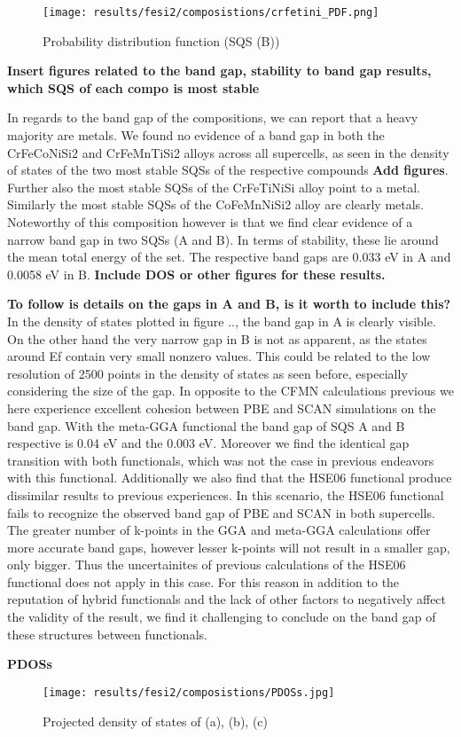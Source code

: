 \begin{figure}[H]
	\centering
	\texttt{[image: results/fesi2/composistions/crfetini\_PDF.png]}
	\caption{Probability distribution function  (SQS (B))}
\end{figure}
    
  
\textbf{Insert figures related to the band gap, stability to band gap results, which SQS of each compo is most stable}  

In regards to the band gap of the compositions, we can report that a heavy majority are metals. We found no evidence of a band gap in both the CrFeCoNiSi2 and CrFeMnTiSi2 alloys across all supercells, as seen in the density of states of the two most stable SQSs of the respective compounds \textbf{Add figures}. Further also the most stable SQSs of the CrFeTiNiSi alloy point to a metal. Similarly the most stable SQSs of the CoFeMnNiSi2 alloy are clearly metals. Noteworthy of this composition however is that we find clear evidence of a narrow band gap in two SQSs (A and B). In terms of stability, these lie around the mean total energy of the set. The respective band gaps are 0.033 eV in A and 0.0058 eV in B. \textbf{Include DOS or other figures for these results.} 

\textbf{To follow is details on the gaps in A and B, is it worth to include this?}
In the density of states plotted in figure .., the band gap in A is clearly visible. On the other hand the very narrow gap in B is not as apparent, as the states around Ef contain very small nonzero values.  This could be related to the low resolution of 2500 points in the density of states as seen before, especially considering the size of the gap. In opposite to the CFMN calculations previous we here experience excellent cohesion between PBE and SCAN simulations on the band gap. With the meta-GGA functional the band gap of SQS A and B respective is 0.04 eV and the 0.003 eV. Moreover we find the identical gap transition with both functionals, which was not the case in previous endeavors with this functional. Additionally we also find that the HSE06 functional produce dissimilar results to previous experiences. In this scenario, the HSE06 functional fails to recognize the observed band gap of PBE and SCAN in both supercells. The greater number of k-points in the GGA and meta-GGA calculations offer more accurate band gaps, however lesser k-points will not result in a smaller gap, only bigger. Thus the uncertainites of previous calculations of the HSE06 functional does not apply in this case. For this reason in addition to the reputation of hybrid functionals and the lack of other factors to negatively affect the validity of the result, we find it challenging to conclude on the band gap of these structures between functionals.

\textbf{PDOSs}
\begin{figure}
\texttt{[image: results/fesi2/composistions/PDOSs.jpg]}
\caption{Projected density of states of (a), (b), (c)}
\end{figure}


